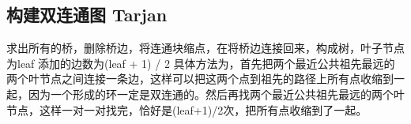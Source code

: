\subsection{构建双连通图 Tarjan}
求出所有的桥，删除桥边，将连通块缩点，在将桥边连接回来，构成树，叶子节点为leaf
添加的边数为(leaf + 1) / 2
具体方法为，首先把两个最近公共祖先最远的两个叶节点之间连接一条边，这样可以把这两个点到祖先的路径上所有点收缩到一起，因为一个形成的环一定是双连通的。然后再找两个最近公共祖先最远的两个叶节点，这样一对一对找完，恰好是(leaf+1)/2次，把所有点收缩到了一起。

